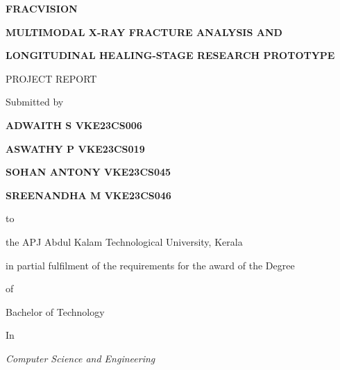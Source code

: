 \documentclass[12pt,a4paper]{article}
\begin{document}
\thispagestyle{empty}
\begin{center}
  \vspace*{-16pt}
  {\fontsize{15pt}{17.5pt}\selectfont\bfseries FRACVISION\par}
  \vspace{2pt}
  {\fontsize{15pt}{17.5pt}\selectfont\bfseries MULTIMODAL X-RAY FRACTURE ANALYSIS AND\par}
  \vspace{2pt}
  {\fontsize{15pt}{17.5pt}\selectfont\bfseries LONGITUDINAL HEALING-STAGE RESEARCH PROTOTYPE\par}
  \vspace{14pt}
  {\fontsize{11.3pt}{14pt}\selectfont PROJECT REPORT\par}
  \vspace{10pt}
  {\fontsize{11.3pt}{14pt}\selectfont Submitted by\par}
  \vspace{10pt}
  {\fontsize{11.3pt}{22pt}\selectfont\bfseries ADWAITH S VKE23CS006\par}
  {\fontsize{11.3pt}{22pt}\selectfont\bfseries ASWATHY P VKE23CS019\par}
  {\fontsize{11.3pt}{22pt}\selectfont\bfseries SOHAN ANTONY VKE23CS045\par}
  {\fontsize{11.3pt}{22pt}\selectfont\bfseries SREENANDHA M VKE23CS046\par}
  \vspace{0pt}
  {\fontsize{11.3pt}{16pt}\selectfont to\par}
  \vspace{2pt}
  {\fontsize{11.3pt}{14pt}\selectfont the APJ Abdul Kalam Technological University, Kerala\par}
  \vspace{2pt}
  {\fontsize{11.3pt}{14pt}\selectfont in partial fulfilment of the requirements for the award of the Degree\par}
  \vspace{2pt}
  {\fontsize{11.3pt}{14pt}\selectfont of\par}
  \vspace{6pt}
  {\fontsize{11.3pt}{14pt}\selectfont Bachelor of Technology\par}
  \vspace{2pt}
  {\fontsize{11.3pt}{14pt}\selectfont In\par}
  \vspace{2pt}
  {\fontsize{11.3pt}{16pt}\selectfont\itshape Computer Science and Engineering\par}

\end{center}
\end{document}

